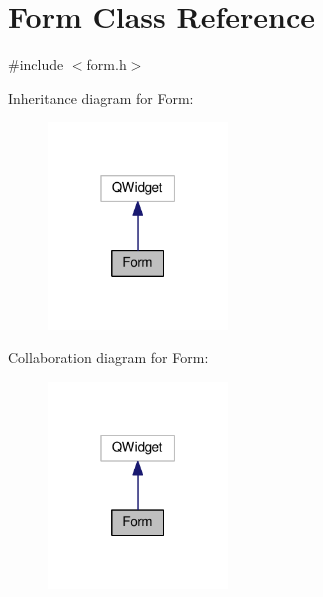 \hypertarget{class_form}{}\section{Form Class Reference}
\label{class_form}


{\ttfamily \#include $<$form.\+h$>$}



Inheritance diagram for Form\+:
\nopagebreak
\begin{figure}[H]
\begin{center}
\leavevmode
\includegraphics[width=135pt]{class_form__inherit__graph}
\end{center}
\end{figure}


Collaboration diagram for Form\+:
\nopagebreak
\begin{figure}[H]
\begin{center}
\leavevmode
\includegraphics[width=135pt]{class_form__coll__graph}
\end{center}
\end{figure}

